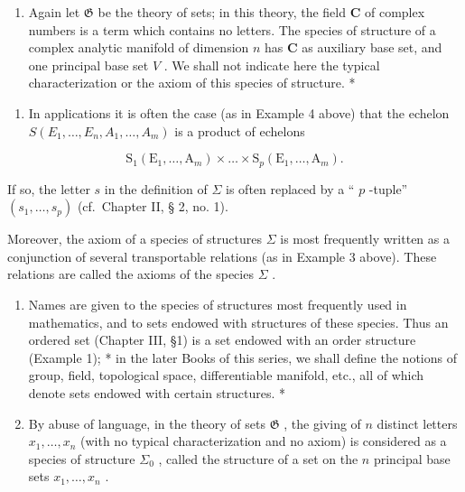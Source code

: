 \begin{enumerate}
\def\labelenumi{(\arabic{enumi})}
\setcounter{enumi}{4}
\tightlist
\item
  Again let \(\mathfrak{G}\) be the theory of sets; in this theory, the field \(\mathbf{C}\) of complex numbers is a term which contains no letters. The species of structure of a complex analytic manifold of dimension \(n\) has \(\mathbf{C}\) as auxiliary base set, and one principal base set \(V\) . We shall not indicate here the typical characterization or the axiom of this species of structure. *
\end{enumerate}


\begin{enumerate}
\def\labelenumi{(\arabic{enumi})}
\tightlist
\item
  In applications it is often the case (as in Example 4 above) that the echelon \(S(E_1, \ldots, E_n, A_1, \ldots, A_m)\) is a product of echelons
\end{enumerate}

\[
\mathrm{S} _ {1} \left(\mathrm{E} _ {1}, \dots , \mathrm{A} _ {m}\right) \times \dots \times \mathrm{S} _ {p} \left(\mathrm{E} _ {1}, \dots , \mathrm{A} _ {m}\right).
\]

If so, the letter \(s\) in the definition of \(\Sigma\) is often replaced by a `` \(p\) -tuple'' \((s_{1}, \ldots, s_{p})\) (cf.~Chapter II, § 2, no. 1).

Moreover, the axiom of a species of structures \(\Sigma\) is most frequently written as a conjunction of several transportable relations (as in Example 3 above). These relations are called the axioms of the species \(\Sigma\) .

\begin{enumerate}
\def\labelenumi{(\arabic{enumi})}
\setcounter{enumi}{1}
\item
  Names are given to the species of structures most frequently used in mathematics, and to sets endowed with structures of these species. Thus an ordered set (Chapter III, §1) is a set endowed with an order structure (Example 1); * in the later Books of this series, we shall define the notions of group, field, topological space, differentiable manifold, etc., all of which denote sets endowed with certain structures. *
\item
  By abuse of language, in the theory of sets \(\mathfrak{G}\) , the giving of \(n\) distinct letters \(x_{1},\ldots,x_{n}\) (with no typical characterization and no axiom) is considered as a species of structure \(\Sigma_{0}\) , called the structure of a set on the \(n\) principal base sets \(x_{1},\ldots,x_{n}\) .
\end{enumerate}

